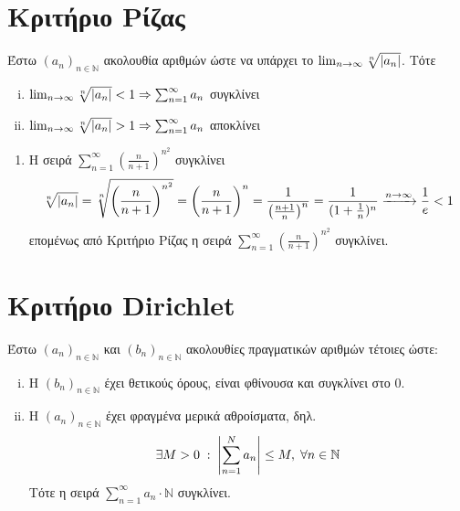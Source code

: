 \documentclass[a4paper,table]{report}
\begin{document}
\section{Κριτήριο Ρίζας}

\begin{mybox3}
\begin{prop}
Έστω $ {(a_{n})}_{n \in \mathbb{N}} $ ακολουθία αριθμών ώστε να υπάρχει το 
    $ \lim_{n \to \infty} \sqrt[n]{\abs{a_{n}}} $. Τότε
    \begin{enumerate}[i)]
        \item $ \lim_{n \to \infty} \sqrt[n]{\abs{a_{n}}} < 1 \Rightarrow 
            \sum_{n=1}^{\infty} a_{n}$ συγκλίνει
        \item $ \lim_{n \to \infty} \sqrt[n]{\abs{a_{n}}} > 1 \Rightarrow 
            \sum_{n=1}^{\infty} a_{n}$ αποκλίνει
\end{enumerate}
\end{prop}
\end{mybox3}

\begin{examples}
\item {}
    \begin{enumerate}
        \item Η σειρά $ \sum_{n=1}^{\infty} \left(\frac{n}{n+1} \right)^{n^{2}} $ 
            συγκλίνει
            \[
                \sqrt[n]{\abs{a_{n}}} = \sqrt[n]{\left(\frac{n}{n+1} \right)^{n^{2}}} 
                = \left(\frac{n}{n+1}\right)^{n} = \frac{1}{\left(\frac{n+1}{n} 
                \right)^{n}} = \frac{1}{(1+ \frac{1}{n})^{n}} \xrightarrow{n \to \infty}
                \frac{1}{e} <1
            \] 
            επομένως από Κριτήριο Ρίζας η σειρά 
            $ \sum_{n=1}^{\infty} \left(\frac{n}{n+1} \right)^{n^{2}} $ συγκλίνει.
    \end{enumerate}
\end{examples}

\section{Κριτήριο Dirichlet}

Έστω $ {(a_{n})}_{n \in \mathbb{N}} $ και $ (b_{n})_{n \in \mathbb{N}} $ ακολουθίες 
πραγματικών αριθμών τέτοιες ώστε:
\begin{enumerate}[i)]
    \item Η $ (b_{n})_{n \in \mathbb{N}} $ έχει θετικούς όρους, είναι φθίνουσα και 
        συγκλίνει στο 0.
    \item Η $ {(a_{n})}_{n \in \mathbb{N}} $ έχει φραγμένα μερικά αθροίσματα, δηλ.
        \[
            \exists M>0 \; : \; \abs{\sum_{n=1}^{N} a_{n}} \leq M, \; 
            \forall n \in \mathbb{N} 
        \] 
        Τότε η σειρά $ \sum_{n=1}^{\infty} a_{n}\cdot \mathbb{N} $ συγκλίνει.
\end{enumerate}
\end{document}
